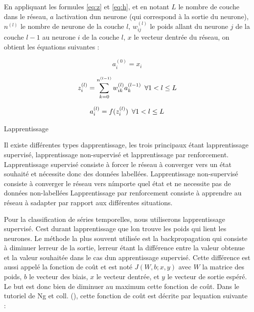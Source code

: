 \documentclass[11pt]{sdm}
\begin{document}
			En appliquant les formules \ref{eq:z} et \ref{eq:h}, et en notant $L$ le nombre de couche dans le r\'eseau, $a$ l\textquotesingle activation d\textquotesingle un neurone (qui correspond \`a la sortie du neurone), $n^{(l)}$ le nombre de neurone de la couche $l$, $w_{ij}^{(l)}$ le poids allant du neurone $j$ de la couche $l-1$ au neurone $i$ de la couche $l$, $x$ le vecteur d\textquotesingle entr\'ee du r\'eseau, on obtient les \'equations suivantes :

			\begin{equation}
				a_i^{(0)} = x_i
				\label{eq:input}
			\end{equation}

			\begin{equation}
				z_i^{(l)} = \sum_{k=0}^{n^{(l-1)}} w_{ik}^{(l)} a_k^{(l-1)} \enskip \forall 1 < l \leq L
				\label{eq:zGlobal}
			\end{equation}

			\begin{equation}
				a_i^{(l)} = f(z_i^{(l)}) \enskip \forall 1 < l \leq L
				\label{eq:activation}
			\end{equation}

			\medbreak
			\begin{itshape}L\textquotesingle apprentissage\end{itshape}
			\smallbreak
			Il existe diff\'erentes types d\textquotesingle apprentissage, les trois principaux \'etant l\textquotesingle apprentissage supervis\'e, l\textquotesingle apprentissage non-supervis\'e et l\textquotesingle apprentissage par renforcement.
			L\textquotesingle apprentissage supervis\'e consiste \`a forcer le r\'eseau \`a converger vers un \'etat souhait\'e et n\'ecessite donc des donn\'ees labell\'ees.
			L\textquotesingle apprentissage non-supervis\'e consiste \`a converger le r\'eseau vers n\'importe quel \'etat et ne necessite pas de donn\'ees non-labell\'ees
			L\textquotesingle apprentissage par renforcement consiste \`a apprendre au r\'eseau \`a s\textquotesingle adapter par rapport aux diff\'erentes situations. 
			
			Pour la classification de s\'eries temporelles, nous utiliserons l\textquotesingle apprentissage supervis\'e.
			C\textquotesingle est durant l\textquotesingle apprentissage que l\textquotesingle on trouve les poids qui lient les neurones. Le m\'ethode la plus souvent utilis\'ee est la backpropagation qui consiste \`a diminuer l\textquotesingle erreur de la sortie, l\textquotesingle erreur \'etant la diff\'erence entre la valeur obtenue et la valeur souhait\'ee dans le cas d\textquotesingle un apprentissage supervis\'e. Cette diff\'erence est aussi appel\'e la fonction de co\^ut et est not\'e $J(W,b;x,y)$ avec $W$ la matrice des poids, $b$ le vecteur des biais, $x$ le vecteur d\textquotesingle entr\'ee, et $y$ le vecteur de sortie esp\'er\'e. Le but est donc bien de diminuer au maximum cette fonction de co\^ut. Dans le tutoriel de Ng et coll. (\cite{ng2012ufldl}), cette fonction de co\^ut est d\'ecrite par l\textquotesingle equation suivante :
\end{document}
